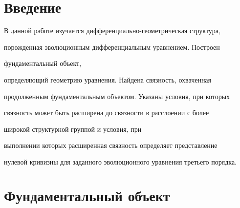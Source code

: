  


\date{} 




 


\pagestyle{plain} %


 


 




 


\maketitle 


\label{begin} 


 


\section*{Введение} 


 


В данной работе изучается дифференциально-геометрическая структура,  


порожденная эволюционным дифференциальным уравнением. Построен  


фундаментальный объект, 


определяющий геометрию уравнения. Найдена связность, охваченная  


продолженным фундаментальным объектом. Указаны условия, при которых  


связность может быть расширена до связности в расслоении с более  


широкой структурной группой и условия, при 


выполнении которых расширенная связность определяет представление  


нулевой кривизны для заданного эволюционного уравнения третьего порядка. 


 


\section{Фундаментальный объект} 


